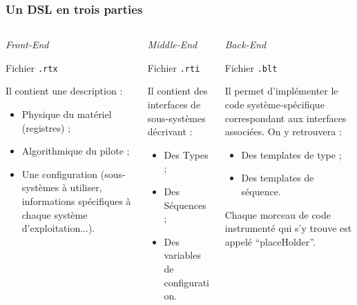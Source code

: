 \documentclass[]{beamer}
\begin{document}
\begin{frame}
\frametitle{Un DSL en trois parties}
\begin{columns}[c]
    
    \begin{column}[l,T]{115pt}
        \begin{center} \large{\itshape{Front-End}} \end{center}
        \scriptsize{
            \begin{center} Fichier \texttt{.rtx} \end{center}
            Il contient une description :
            \begin{itemize}
                \item Physique du matériel (registres) ;
                \item Algorithmique du pilote ;
                \item Une configuration (sous-systèmes à utiliser, informations
                                         spécifiques à chaque système
                                         d'exploitation...).
            \end{itemize}
        }
    \end{column}
    
    \begin{column}[c,T]{115pt}
        \begin{center} \large{\itshape{Middle-End}} \end{center}
        \scriptsize{
            \begin{center} Fichier \texttt{.rti} \end{center}
            Il contient des interfaces de sous-systèmes décrivant :
            \begin{itemize}
                \item Des Types ;
                \item Des Séquences ;
                \item Des variables de configuration.
            \end{itemize}
        }
    \end{column}
    
    \begin{column}[r,T]{115pt}
        \begin{center} \large{\itshape{Back-End}} \end{center}
        \scriptsize{
            \begin{center} Fichier \texttt{.blt} \end{center}
            Il permet d'implémenter le code système-spécifique correspondant
            aux interfaces associées. On y retrouvera :
            \begin{itemize}
                \item Des templates de type ;
                \item Des templates de séquence.
            \end{itemize}
            Chaque morceau de code instrumenté qui s'y trouve est appelé
            ``placeHolder''.
        }
    \end{column}


\end{columns}
\end{frame}
\end{document}
